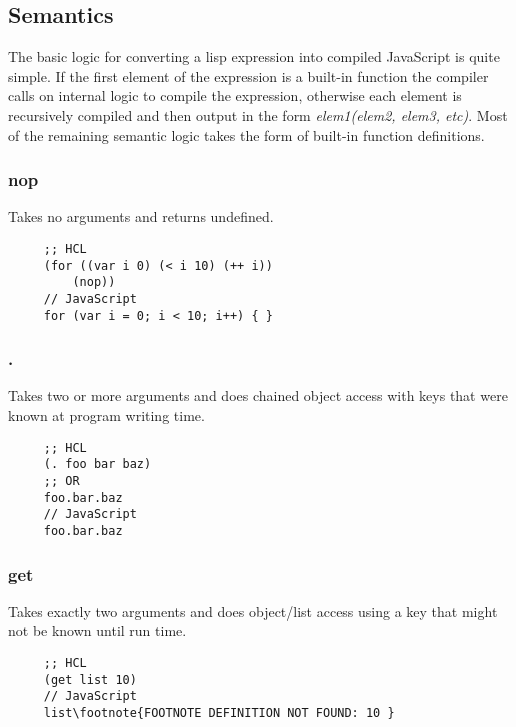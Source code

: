\documentclass[11pt]{article}
\begin{document}
\subsection{Semantics}
\label{sec-1.3}

   The basic logic for converting a lisp expression into compiled
   JavaScript is quite simple.  If the first element of the expression
   is a built-in function the compiler calls on internal logic to
   compile the expression, otherwise each element is recursively
   compiled and then output in the form \emph{elem1(elem2, elem3, etc)}.
   Most of the remaining semantic logic takes the form of built-in function
   definitions.

\subsubsection{nop}
\label{sec-1.3.1}

    Takes no arguments and returns undefined.
    
\begin{verbatim}
     ;; HCL
     (for ((var i 0) (< i 10) (++ i))
         (nop))
     // JavaScript
     for (var i = 0; i < 10; i++) { }
\end{verbatim}


\subsubsection{.}
\label{sec-1.3.2}

    Takes two or more arguments and does chained object access with
    keys that were known at program writing time.

\begin{verbatim}
     ;; HCL
     (. foo bar baz)
     ;; OR
     foo.bar.baz
     // JavaScript
     foo.bar.baz
\end{verbatim}


\subsubsection{get}
\label{sec-1.3.3}

    Takes exactly two arguments and does object/list access using a
    key that might not be known until run time.

\begin{verbatim}
     ;; HCL
     (get list 10)
     // JavaScript
     list\footnote{FOOTNOTE DEFINITION NOT FOUND: 10 }
\end{verbatim}
\end{document}
